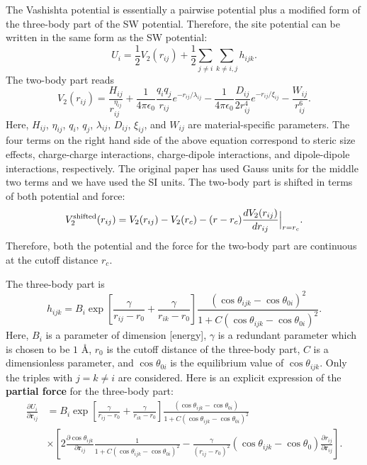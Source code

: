 \documentclass[12pt,a4paper]{report}
\newcommand{\vect}[1]{\boldsymbol{#1}}
\begin{document}
The Vashishta potential \cite{vashishta2007jap} is essentially a pairwise potential plus a modified form of the three-body part of the SW potential. Therefore, the site potential can be written in the same form as the SW potential:
\begin{equation}
U_i = \frac{1}{2} V_2(r_{ij}) + \frac{1}{2}\sum_{j\neq i}\sum_{k\neq i,j} h_{ijk}.
\end{equation}
The two-body part reads
\begin{equation}
V_2(r_{ij}) =  
\frac{H_{ij}}{r_{ij}^{\eta_{ij}}} + 
\frac{1}{4\pi\epsilon_0} \frac{q_{i}q_{j}}{r_{ij}} e^{-r_{ij}/\lambda_{ij}} -
\frac{1}{4\pi\epsilon_0} \frac{D_{ij}}{2r_{ij}^4} e^{-r_{ij}/\xi_{ij}}  -
\frac{W_{ij}}{r_{ij}^6}.
\end{equation}
Here, $H_{ij}$, $\eta_{ij}$, $q_{i}$, $q_{j}$, $\lambda_{ij}$, $D_{ij}$, $\xi_{ij}$, and $W_{ij}$ are material-specific parameters. The four terms on the right hand side of the above equation correspond to steric size effects, charge-charge interactions, charge-dipole interactions, and dipole-dipole interactions, respectively. The original paper \cite{vashishta2007jap} has used Gauss units for the middle two terms and we have used the SI units. The two-body part is shifted in terms of both potential and force:
\begin{equation}
V_2^{\rm shifted}(r_{ij}) = V_2(r_{ij}) - V_2(r_{c}) -(r-r_c) \frac{dV_2(r_{ij})}{dr_{ij}}\Big|_{r=r_c}.
\end{equation}
Therefore, both the potential and the force for the two-body part are continuous at the cutoff distance $r_c$.

The three-body part is
\begin{equation}
h_{ijk}=B_i
\exp
\left[
\frac{\gamma}{r_{ij}-r_0} + \frac{\gamma}{r_{ik}-r_0}
\right]
\frac{\left(\cos \theta_{ijk} - \cos \theta_{0i} \right)^2}{1 + C \left(\cos \theta_{ijk} - \cos \theta_{0i} \right)^2}.
\end{equation}
Here, $B_i$ is a parameter of dimension [energy], $\gamma$ is a redundant parameter which is chosen to be $1$ \AA, $r_0$ is the cutoff distance of the three-body part, $C$ is a dimensionless parameter, and $\cos \theta_{0i}$ is the equilibrium value of $\cos \theta_{ijk}$. Only the triples with $j= k \neq i$ are considered. Here is an explicit expression of the \textbf{partial force} for the three-body part:
\begin{align}
\frac{\partial U_i}{\partial \vect{r}_{ij}}
&= B_i \exp \left[
 \frac{\gamma}{r_{ij}-r_0} + \frac{\gamma}{r_{ik}-r_0}
\right] \frac{\left(\cos \theta_{ijk} - \cos \theta_{0i} \right)}{1 + C \left(\cos \theta_{ijk} - \cos \theta_{0i} \right)^2} \nonumber \\
&\times
\left[
  2 \frac{\partial \cos \theta_{ijk}} {\partial \vect{r}_{ij}}\frac{1}{1 + C \left(\cos \theta_{ijk} - \cos \theta_{0i} \right)^2} -
  \frac{\gamma}{ \left(r_{ij} - r_0 \right)^2}
  \left(\cos \theta_{ijk} - \cos \theta_{0} \right)
  \frac{\partial r_{ij}} {\partial \vect{r}_{ij}}
\right].
\end{align}
\end{document}

